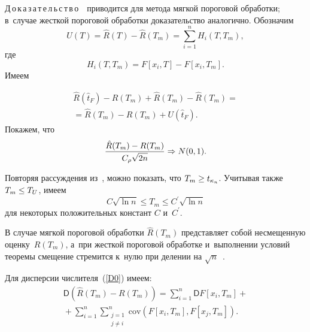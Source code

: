 \begin{multicols}{2}
\noindent
Д\,о\,к\,а\,з\,а\,т\,е\,л\,ь\,с\,т\,в\,о\  \
 приводится для метода мягкой пороговой обработки; в~случае жесткой пороговой 
обработки доказательство аналогично. Обозначим
$$
U(T) = \hat{R}(T) -  \hat{R}(T_m) = \sum \limits_{i=1}^n H_i(T, T_m),
$$
где
$$
H_i(T, T_m) = F[x_i, T] - F[x_i, T_m].
$$
Имеем

\vspace*{-3pt}

\noindent
\begin{multline}
\label{D00}
\hat{R}(\hat{t}_F) - R(T_m) + \hat{R}(T_m) - \hat{R}(T_m) ={}\\
{}= \hat{R}(T_m) - 
R(T_m) + U(\hat{t}_F).
\end{multline}
Покажем, что
\begin{equation}
\label{D0}
\displaystyle\frac{\displaystyle \hat{R}(T_m) - R(T_m)\mathstrut}{\displaystyle C_\rho\sqrt{2n}\mathstrut} \Rightarrow N(0, 1).
\end{equation}


Повторяя рассуждения из~\cite{KuShe2016_1,KuShe2016_2,Jansen}, можно показать, 
что $T_m \hm\geq t_{\kappa_n}$. Учитывая также $T_m\hm \leq T_U$, имеем 
$$
C \sqrt{\ln n} \leq T_m \leq C^\prime \sqrt{\ln n}
$$ 
для некоторых положительных констант $C$ и~$C^\prime$.

\columnbreak

В случае мягкой пороговой обработки $\hat{R}(T_m)$ представляет собой 
несмещенную оценку~$R(T_m)$, а~при жесткой пороговой обработке и~выполнении 
условий теоремы смещение стремится к~нулю при делении на $\sqrt{n}$~\cite{Mallat}.

Для дисперсии числителя~(\ref{D0}) имеем:
\begin{multline*}
{\mathsf D} \left(\hat{R}(T_m) - R(T_m)\right) = \sum\limits_{i=1}^n {\mathsf D} F[x_i, T_m] + {}\\
{}+
\sum\limits_{i=1}^n\sum\limits_{\substack{j=1 \\  j\neq i}}^n \mathrm{cov}\left( F[x_i, T_m], F[x_j, 
T_m] \right).
\end{multline*}


\end{multicols}
